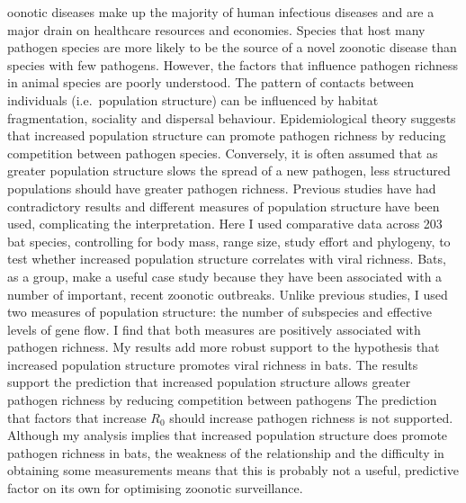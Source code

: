 oonotic diseases make up the majority of human infectious diseases and are a major drain on healthcare resources and economies.
Species that host many pathogen species are more likely to be the source of a novel zoonotic disease than species with few pathogens.
However, the factors that influence pathogen richness in animal species are poorly understood.
%
%
The pattern of contacts between individuals (i.e.\ population structure) can be influenced by habitat fragmentation, sociality and dispersal behaviour.
Epidemiological theory suggests that increased population structure can promote pathogen richness by reducing competition between pathogen species.
Conversely, it is often assumed that as greater population structure slows the spread of a new pathogen, less structured populations should have greater pathogen richness.
%
%
Previous studies have had contradictory results and different measures of population structure have been used, complicating the interpretation.
%
%
Here I used comparative data across 203 bat species, controlling for body mass, range size, study effort and phylogeny, to test whether increased population structure correlates with viral richness.
Bats, as a group, make a useful case study because they have been associated with a number of important, recent zoonotic outbreaks.
Unlike previous studies, I used two measures of population structure: the number of subspecies and effective levels of gene flow.
I find that both measures are positively associated with pathogen richness.
%
%
My results add more robust support to the hypothesis that increased population structure promotes viral richness in bats.
The results support the prediction that increased population structure allows greater pathogen richness by reducing competition between pathogens
The prediction that factors that increase $R_0$ should increase pathogen richness is not supported.
%
%
Although my analysis implies that increased population structure does promote pathogen richness in bats, the weakness of the relationship and the difficulty in obtaining some measurements means that this is probably not a useful, predictive factor on its own for optimising zoonotic surveillance.





